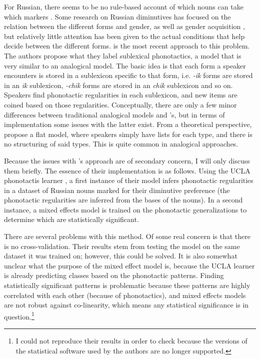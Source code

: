 For Russian, there seems to be no rule-based account of which nouns can take which markers \autocite{Gouskova.2015}. Some research on Russian diminutives has focused on the relation between the different forms and gender, as well as gender acquisition \autocites{Kempe.2010, Protassova.2007, Voeykova.1998}, but relatively little attention has been given to the actual conditions that help decide between the different forms. \textcite{Gouskova.2015} is the most recent approach to this problem. The authors propose what they label sublexical phonotactics, a model that is very similar to an analogical model. The basic idea is that each form a speaker encounters is stored in a sublexicon specific to that form, i.e. \textit{-ik} forms are stored in an \textit{ik} sublexicon, \textit{-chik} forms are stored in an \textit{chik} sublexicon and so on. Speakers find phonotactic regularities in each sublexicon, and new items are coined based on those regularities. Conceptually, there are only a few minor differences between traditional analogical models and \textcite{Gouskova.2015}'s, but in terms of implementation some issues with the latter exist. From a theoretical perspective, \textcite{Gouskova.2015} propose a flat model, where speakers simply have lists for each type, and there is no structuring of said types. This is quite common in analogical approaches. %

Because the issues with \textcite{Gouskova.2015}'s approach are of secondary concern, I will only discuss them briefly. The essence of their implementation is as follows. Using the UCLA phonotactis learner \autocite{Hayes.2008}, a first instance of their model infers phonotactic regularities in a dataset of Russian nouns marked for their diminutive preference (the phonotactic regularities are inferred from the bases of the nouns). In a second instance, a mixed effects model is trained on the phonotactic generalizations to determine which are statistically significant.

\largerpage[-1]
There are several problems with this method. Of some real concern is that there is no cross-validation. Their results stem from testing the model on the same dataset it was trained on; however, this could be solved. It is also somewhat unclear what the purpose of the mixed effect model is, because the UCLA learner is already predicting classes based on the phonotactic patterns. Finding statistically significant patterns is problematic because these patterns are highly correlated with each other (because of phonotactics), and mixed effects models are not robust against co-linearity, which means any statistical significance is in question.\footnote{I could not reproduce their results in order to check because the versions of the statistical software used by the authors are no longer supported.}

